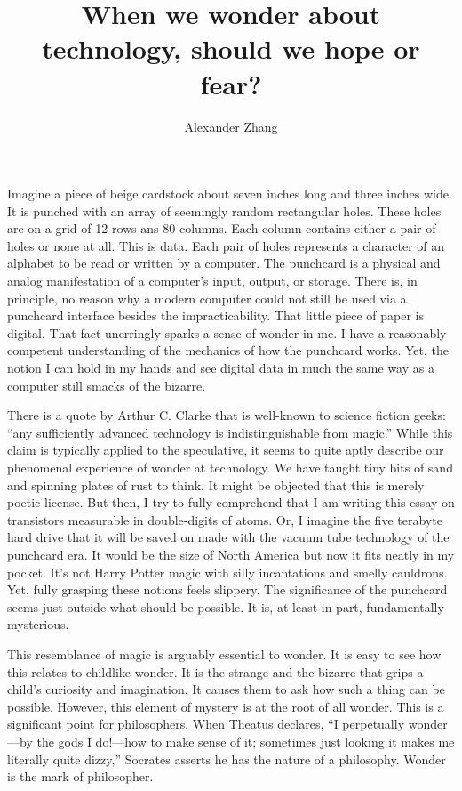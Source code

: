 \documentclass[12pt, letterpaper]{article}
\title{When we wonder about technology, should we hope or fear?}
\author{Alexander Zhang}
\begin{document}
\maketitle

Imagine a piece of beige cardstock about seven inches long and three inches
wide.
It is punched with an array of seemingly random rectangular holes.
These holes are on a grid of  12-rows ans 80-columns.
Each column contains either a pair of holes or none at all.
This is data.
Each pair of holes represents a character of an alphabet to be read or written
by a computer.
The punchcard is a physical and analog manifestation of a computer's input, output, or
storage.
There is, in principle, no reason why a modern computer could not still be used
via a punchcard interface besides the impracticability.
That little piece of paper is digital.
That fact unerringly sparks a sense of wonder in me.
I have a reasonably competent understanding of the mechanics of how the
punchcard works.
Yet, the notion I can hold in my hands and see digital data in much the same way
as a computer still smacks of the bizarre.

There is a quote by Arthur C. Clarke that is well-known to science fiction
geeks: ``any sufficiently
advanced technology is indistinguishable from magic.''
While this claim is typically applied to the speculative, it seems to quite
aptly describe our phenomenal experience of wonder at technology.
We have taught tiny bits of sand and spinning plates of rust to think.
It might be objected that this is merely poetic license.
But then, I try to fully comprehend that I am writing this essay on transistors
measurable in double-digits of atoms.
Or, I imagine the five terabyte hard drive that it will be saved on made with
the vacuum tube technology of the punchcard era.
It would be the size of North America but now it fits neatly in my pocket.
It's not Harry Potter magic with silly incantations and smelly cauldrons.
Yet, fully grasping these notions feels slippery.
The significance of the punchcard seems just outside what should be possible.
It is, at least in part, fundamentally mysterious.

This resemblance of magic is arguably essential to wonder.
It is easy to see how this relates to childlike wonder.
It is the strange and the bizarre that grips a child's curiosity and
imagination.
It causes them to ask how such a thing can be possible.
However, this element of mystery is at the root of all wonder.
This is a significant point for philosophers.
When Theatus declares, ``I perpetually wonder---by the gods I do!---how to make
sense of it; sometimes just looking it makes me literally quite dizzy,''
Socrates asserts he has the nature of a philosophy.
Wonder is the mark of philosopher.
\end{document}
